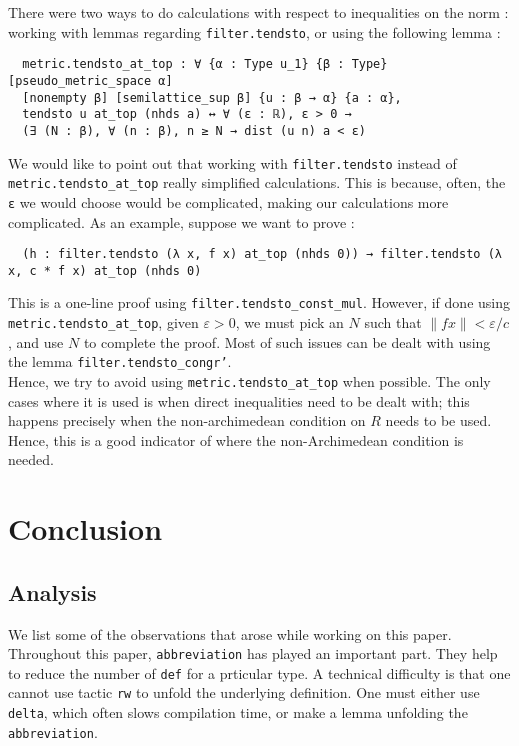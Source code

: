\documentclass[a4paper,UKenglish,cleveref, autoref, thm-restate]{lipics-v2021}
\newcommand{\lean}[1]{\texttt{#1}\xspace} %
\begin{document}
There were two ways to do calculations with respect to inequalities on the norm : working with lemmas regarding \lean{filter.tendsto}, 
or using the following lemma : 
\begin{lstlisting}
  metric.tendsto_at_top : ∀ {α : Type u_1} {β : Type} [pseudo_metric_space α] 
  [nonempty β] [semilattice_sup β] {u : β → α} {a : α}, 
  tendsto u at_top (nhds a) ↔ ∀ (ε : ℝ), ε > 0 → 
  (∃ (N : β), ∀ (n : β), n ≥ N → dist (u n) a < ε)
\end{lstlisting}
We would like to point out that working with \lean{filter.tendsto} instead of \lean{metric.tendsto\_at\_top} really simplified 
calculations. This is because, often, the \lean{ε} we would choose would be complicated, making our calculations more 
complicated. As an example, suppose we want to prove :
\begin{lstlisting}
  (h : filter.tendsto (λ x, f x) at_top (nhds 0)) → filter.tendsto (λ x, c * f x) at_top (nhds 0)
\end{lstlisting}
This is a one-line proof using \lean{filter.tendsto\_const\_mul}. However, if done using \lean{metric.tendsto\_at\_top}, 
given $\varepsilon > 0$, we must pick an $N$ such that $\lVert f x \rVert < \varepsilon / c$, and use $N$ to complete the proof. 
Most of such issues can be dealt with using the lemma \lean{filter.tendsto\_congr'}. \\

Hence, we try to avoid using \lean{metric.tendsto\_at\_top} when possible. The only cases where it is used is when direct inequalities 
need to be dealt with; this happens precisely when the non-archimedean condition on $R$ needs to be used. Hence, this is a good 
indicator of where the non-Archimedean condition is needed.

\section{Conclusion}
\subsection{Analysis}
We list some of the observations that arose while working on this paper. \\
Throughout this paper, \lean{abbreviation} has played an important part. They help to reduce the number of \lean{def} for a prticular type. A technical 
difficulty is that one cannot use tactic \lean{rw} to unfold the underlying definition. One must either use \lean{delta}, which often slows compilation 
time, or make a lemma unfolding the \lean{abbreviation}. \\ 
\end{document}
